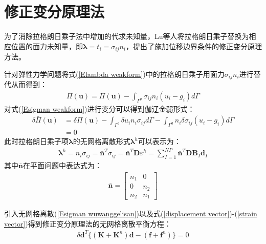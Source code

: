 \section{修正变分原理法}
为了消除拉格朗日乘子法中增加的代求未知量，Lu等人\cite{}将拉格朗日乘子替换为相应位置的面力未知量，即$\pmb{\lambda}=t_i=\sigma_{ij}n_i$，提出了施加位移边界条件的修正变分原理方法。\par
针对弹性力学问题将式(\ref{Elambda weakform})中的拉格朗日乘子用面力$\sigma_{ij}n_i$进行替代从而得到：
\begin{equation}
\begin{split}\label{Esigman weakform}
    \bar{\Pi}(\pmb{u})=\Pi(\pmb{u})-\int_{\Gamma^g}\sigma_{ij}n_i(u_i-g_i)d\Gamma
\end{split}
\end{equation}
对式(\ref{Esigman weakform})进行变分可以得到伽辽金弱形式：
\begin{equation}
\begin{split}
    \delta\bar{\Pi}(\pmb{u})&=\delta\Pi(\pmb{u})-\int_{\Gamma^g}\delta u_in_i\sigma_{ij}d\Gamma-\int_{\Gamma^g}n_i\delta\sigma_{ij}(u_i-g_i)d\Gamma\\
    &=0
\end{split}
\end{equation}
此时拉格朗日乘子项$\pmb{\lambda}$的无网格离散形式$\pmb{\lambda}^h$可以表示为：
\begin{equation}\label{Esigman wuwanggelisan}
\begin{split}
    \pmb{\lambda}^h=n_i\sigma_{ij}=\bar{\pmb n}^T\sigma_{ij}=\bar{\pmb n}^T\pmb{D}\varepsilon^h=\sum_{I=1}^{N\!P}\bar{\pmb n}^T\pmb{D}\pmb{B}_I\pmb{d}_I
\end{split}
\end{equation}
其中$\bar{\pmb{n}}$在平面问题中表达式为：
\begin{equation}
\begin{split}
    \bar{\pmb n}=\left[\begin{matrix}n_1&0\\0&n_2\\n_2&n_1
    \end{matrix}\right]
\end{split}
\end{equation}\par
引入无网格离散(\ref{Esigman wuwanggelisan})以及式(\ref{displacement vector})-(\ref{strain vector})得到修正变分原理法的无网格离散平衡方程：
\begin{equation}
\begin{split}
   \delta\pmb{d}^T\{(\pmb{K}+\pmb{K}^n)\pmb{d}-(\pmb{f}+\pmb{f}^n)\}=0\\
\end{split}
\end{equation}
